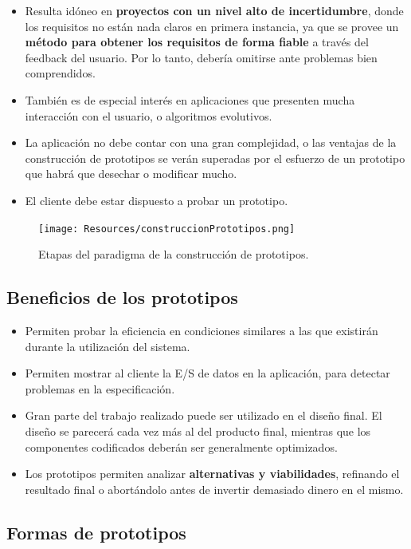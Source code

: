 \begin{itemize}
   \item Resulta idóneo en \textbf{proyectos con un nivel alto de incertidumbre}, donde los requisitos no están nada claros en primera instancia, ya que se provee un \textbf{método para obtener los requisitos de forma fiable} a través del feedback del usuario. Por lo tanto, debería omitirse ante problemas bien comprendidos.
   \item También es de especial interés en aplicaciones que presenten mucha interacción con el usuario, o algoritmos evolutivos.
   \item La aplicación no debe contar con una gran complejidad, o las ventajas de la construcción de prototipos se verán superadas por el esfuerzo de un prototipo que habrá que desechar o modificar mucho.
   \item El cliente debe estar dispuesto a probar un prototipo.
\end{itemize}

\begin{figure}[H]
   \centering
   \texttt{[image: Resources/construccionPrototipos.png]}
   \caption{Etapas del paradigma de la construcción de prototipos.}
   \label{fig:construccionPrototipos}
\end{figure}

\subsection{Beneficios de los prototipos}

\begin{itemize}
   \item Permiten probar la eficiencia en condiciones similares a las que existirán durante la utilización del sistema.
   \item Permiten mostrar al cliente la E/S de datos en la aplicación, para detectar problemas en la especificación.
   \item Gran parte del trabajo realizado puede ser utilizado en el diseño final. El diseño se parecerá cada vez más al del producto final, mientras que los componentes codificados deberán ser generalmente optimizados.
   \item Los prototipos permiten analizar \textbf{alternativas y viabilidades}, refinando el resultado final o abortándolo antes de invertir demasiado dinero en el mismo.
\end{itemize}

\subsection{Formas de prototipos}

